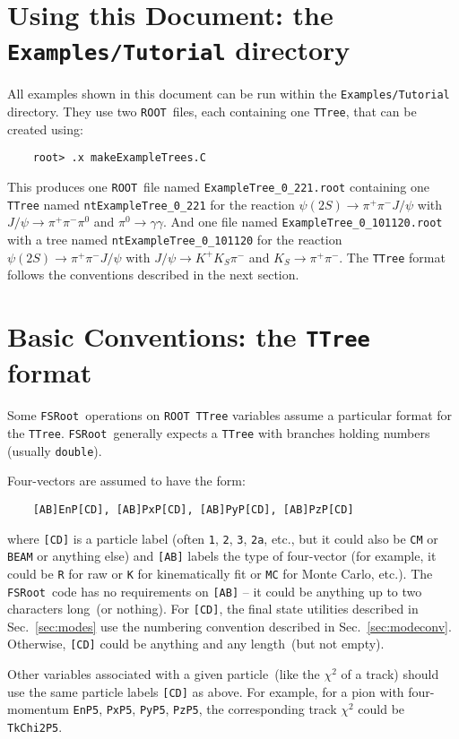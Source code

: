 \documentclass[11pt]{article}
\newcommand{\FSR}{{\tt FSRoot}}
\newcommand{\ROOT}{{\tt ROOT}}
\begin{document}
\section{Using this Document: the {\tt Examples/Tutorial} directory}
\label{sec:tutorial}

All examples shown in this document can be run within the {\tt Examples/Tutorial} directory.  They use two \ROOT\ files, each containing one {\tt TTree}, that can be created using:
\begin{verbatim}
    root> .x makeExampleTrees.C
\end{verbatim}
This produces one \ROOT\ file named {\tt ExampleTree\_0\_221.root} containing one {\tt TTree} named {\tt ntExampleTree\_0\_221} for the reaction
$\psi(2S)\to\pi^+\pi^-J/\psi$ with $J/\psi \to \pi^+\pi^-\pi^0$ and $\pi^0 \to \gamma \gamma$.  
And one file named {\tt ExampleTree\_0\_101120.root} with a tree named {\tt ntExampleTree\_0\_101120} for the reaction 
$\psi(2S)\to\pi^+\pi^-J/\psi$ with $J/\psi \to K^+K_S\pi^-$ and $K_S \to \pi^+\pi^-$.  The {\tt TTree} format follows the conventions described in the next section.

\section{Basic Conventions: the {\tt TTree} format}
\label{sec:conventions}

Some \FSR\ operations on \ROOT\ {\tt TTree} variables assume a particular format for the {\tt TTree}.  \FSR\ generally expects a {\tt TTree} with branches holding numbers (usually {\tt double}).

Four-vectors are assumed to have the form:
\begin{verbatim}
    [AB]EnP[CD], [AB]PxP[CD], [AB]PyP[CD], [AB]PzP[CD]
\end{verbatim}
where {\tt [CD]} is a particle label (often {\tt 1}, {\tt 2}, {\tt 3}, {\tt 2a}, etc., but it could also be {\tt CM} or {\tt BEAM} or anything else) and {\tt [AB]} labels the type of four-vector (for example, it could be {\tt R} for raw or {\tt K} for kinematically fit or {\tt MC} for Monte Carlo, etc.).  The \FSR\ code has no requirements on {\tt [AB]} -- it could be anything up to two characters long~(or nothing).  For {\tt [CD]}, the final state utilities described in Sec.~\ref{sec:modes} use the numbering convention described in Sec.~\ref{sec:modeconv}.  
Otherwise, {\tt [CD]} could be anything and any length~(but not empty).

Other variables associated with a given particle~(like the $\chi^2$ of a track) should use the same particle labels {\tt [CD]} as above.  For example, for a pion with four-momentum {\tt EnP5}, {\tt PxP5}, {\tt PyP5}, {\tt PzP5}, the corresponding track $\chi^2$ could be {\tt TkChi2P5}.
\end{document}
